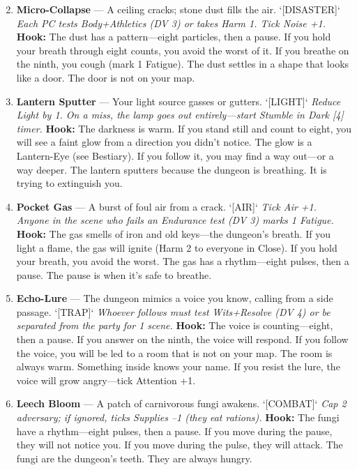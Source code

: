 \begin{enumerate}
\setcounter{enumi}{1}
\item \textbf{Micro-Collapse} --- A ceiling cracks; stone dust fills the air. `[DISASTER]`
  \hfill \textit{Each PC tests Body+Athletics (DV 3) or takes Harm 1. Tick Noise +1.}
  \textbf{Hook:} The dust has a pattern---eight particles, then a pause. If you hold your breath through eight counts, you avoid the worst of it. If you breathe on the ninth, you cough (mark 1 Fatigue). The dust settles in a shape that looks like a door. The door is not on your map.

\item \textbf{Lantern Sputter} --- Your light source gasses or gutters. `[LIGHT]`
  \hfill \textit{Reduce Light by 1. On a miss, the lamp goes out entirely---start Stumble in Dark [4] timer.}
  \textbf{Hook:} The darkness is warm. If you stand still and count to eight, you will see a faint glow from a direction you didn't notice. The glow is a Lantern-Eye (see Bestiary). If you follow it, you may find a way out---or a way deeper. The lantern sputters because the dungeon is breathing. It is trying to extinguish you.

\item \textbf{Pocket Gas} --- A burst of foul air from a crack. `[AIR]`
  \hfill \textit{Tick Air +1. Anyone in the scene who fails an Endurance test (DV 3) marks 1 Fatigue.}
  \textbf{Hook:} The gas smells of iron and old keys---the dungeon's breath. If you light a flame, the gas will ignite (Harm 2 to everyone in Close). If you hold your breath, you avoid the worst. The gas has a rhythm---eight pulses, then a pause. The pause is when it's safe to breathe.

\item \textbf{Echo-Lure} --- The dungeon mimics a voice you know, calling from a side passage. `[TRAP]`
  \hfill \textit{Whoever follows must test Wits+Resolve (DV 4) or be separated from the party for 1 scene.}
  \textbf{Hook:} The voice is counting---eight, then a pause. If you answer on the ninth, the voice will respond. If you follow the voice, you will be led to a room that is not on your map. The room is always warm. Something inside knows your name. If you resist the lure, the voice will grow angry---tick Attention +1.

\item \textbf{Leech Bloom} --- A patch of carnivorous fungi awakens. `[COMBAT]`
  \hfill \textit{Cap 2 adversary; if ignored, ticks Supplies --1 (they eat rations).}
  \textbf{Hook:} The fungi have a rhythm---eight pulses, then a pause. If you move during the pause, they will not notice you. If you move during the pulse, they will attack. The fungi are the dungeon's teeth. They are always hungry.


\end{enumerate}
